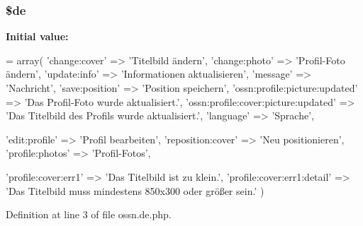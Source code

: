 \subsubsection[{\texorpdfstring{\$de}{$de}}]{\setlength{\rightskip}{0pt plus 5cm}\$de}\hypertarget{components_2_ossn_profile_2locale_2ossn_8de_8php_aab7de7e51b4580005f63dd4cf5e17311}{}\label{components_2_ossn_profile_2locale_2ossn_8de_8php_aab7de7e51b4580005f63dd4cf5e17311}
{\bfseries Initial value\+:}
\begin{DoxyCode}
= array(
        \textcolor{stringliteral}{'change:cover'} => \textcolor{stringliteral}{'Titelbild ändern'},
        \textcolor{stringliteral}{'change:photo'} => \textcolor{stringliteral}{'Profil-Foto ändern'},
        \textcolor{stringliteral}{'update:info'} => \textcolor{stringliteral}{'Informationen aktualisieren'},
        \textcolor{stringliteral}{'message'} => \textcolor{stringliteral}{'Nachricht'},
        \textcolor{stringliteral}{'save:position'} => \textcolor{stringliteral}{'Position speichern'},
        \textcolor{stringliteral}{'ossn:profile:picture:updated'} => \textcolor{stringliteral}{'Das Profil-Foto wurde aktualisiert.'},
        \textcolor{stringliteral}{'ossn:profile:cover:picture:updated'} => \textcolor{stringliteral}{'Das Titelbild des Profils wurde aktualisiert.'},
        \textcolor{stringliteral}{'language'} => \textcolor{stringliteral}{'Sprache'},
        
        \textcolor{stringliteral}{'edit:profile'} => \textcolor{stringliteral}{'Profil bearbeiten'},
        \textcolor{stringliteral}{'reposition:cover'} => \textcolor{stringliteral}{'Neu positionieren'},
        \textcolor{stringliteral}{'profile:photos'} => \textcolor{stringliteral}{'Profil-Fotos'},
        
        \textcolor{stringliteral}{'profile:cover:err1'} => \textcolor{stringliteral}{'Das Titelbild ist zu klein.'},
        \textcolor{stringliteral}{'profile:cover:err1:detail'} => \textcolor{stringliteral}{'Das Titelbild muss mindestens 850x300 oder größer sein.'}
)
\end{DoxyCode}


Definition at line 3 of file ossn.\+de.\+php.

